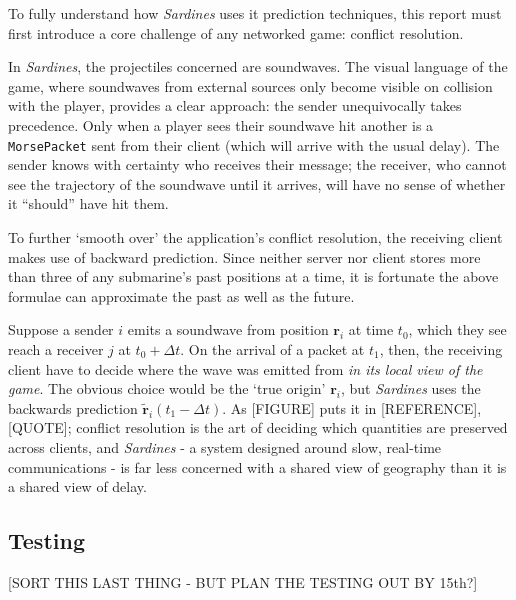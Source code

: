 \documentclass[a4paper, 11pt]{article}
\begin{document}
\begin{flushleft}
\vspace{5pt}

\vspace{5pt}\noindent
To fully understand how \textit{Sardines} uses it prediction techniques, this report must first introduce a core challenge of any networked game: conflict resolution.

\vspace{5pt}\noindent
In \textit{Sardines}, the projectiles concerned are soundwaves. The visual language of the game, where soundwaves from external sources only become visible on collision with the player, provides a clear approach: the sender unequivocally takes precedence. Only when a player sees their soundwave hit another is a \texttt{MorsePacket} sent from their client (which will arrive with the usual delay). The sender knows with certainty who receives their message; the receiver, who cannot see the trajectory of the soundwave until it arrives, will have no sense of whether it ``should'' have hit them.

\vspace{5pt}\noindent
To further `smooth over' the application's conflict resolution, the receiving client makes use of backward prediction. Since neither server nor client stores more than three of any submarine's past positions at a time, it is fortunate the above formulae can approximate the past as well as the future.

\vspace{5pt}\noindent
Suppose a sender $i$ emits a soundwave from position $\mathbf{r}_i$ at time $t_0$, which they see reach a receiver $j$ at $t_0+\Delta t$. On the arrival of a packet at $t_1$, then, the receiving client have to decide where the wave was emitted from \textit{in its local view of the game}. The obvious choice would be the `true origin' $\mathbf{r}_i$, but \textit{Sardines} uses the backwards prediction $\mathbf{\tilde{r}}_i(t_1-\Delta t)$. As [FIGURE] puts it in [REFERENCE], [QUOTE]; conflict resolution is the art of deciding which quantities are preserved across clients, and \textit{Sardines} - a system designed around slow, real-time communications - is far less concerned with a shared view of geography than it is a shared view of delay.

\subsection*{Testing}

[SORT THIS LAST THING - BUT PLAN THE TESTING OUT BY 15th?]

%
%
\end{flushleft}
\end{document}
